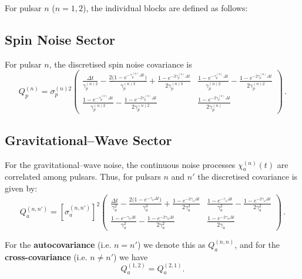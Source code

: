 \documentclass{tufte-handout} %
\begin{document}
	For pulsar \(n\) (\(n=1,2\)), the individual blocks are defined as follows:
	
	\subsection*{Spin Noise Sector}
	
	For pulsar \(n\), the discretised spin noise covariance is
	\begin{equation}
		Q_p^{(n)} = \sigma_p^{(n)2}
		\begin{pmatrix}
			\displaystyle \frac{\Delta t}{\gamma_p^{(n)2}} - \frac{2\bigl(1-e^{-\gamma_p^{(n)}\Delta t}\bigr)}{\gamma_p^{(n)3}} + \frac{1-e^{-2\gamma_p^{(n)}\Delta t}}{2\gamma_p^{(n)3}} 
			& \displaystyle \frac{1-e^{-\gamma_p^{(n)}\Delta t}}{\gamma_p^{(n)2}} - \frac{1-e^{-2\gamma_p^{(n)}\Delta t}}{2\gamma_p^{(n)2}} \\[2mm]
			\displaystyle \frac{1-e^{-\gamma_p^{(n)}\Delta t}}{\gamma_p^{(n)2}} - \frac{1-e^{-2\gamma_p^{(n)}\Delta t}}{2\gamma_p^{(n)2}} 
			& \displaystyle \frac{1-e^{-2\gamma_p^{(n)}\Delta t}}{2\gamma_p^{(n)}}
		\end{pmatrix}\,.
	\end{equation}
	
	\subsection*{Gravitational--Wave Sector}
	
	For the gravitational--wave noise, the continuous noise processes \(\chi_a^{(n)}(t)\) are correlated among pulsars. Thus, for pulsars \(n\) and \(n'\) the discretised covariance is given by:
	\begin{equation}
		Q_a^{(n,n')} = \left[\sigma_a^{(n,n')}\right]^2
		\begin{pmatrix}
			\displaystyle \frac{\Delta t}{\gamma_a^2} - \frac{2\bigl(1-e^{-\gamma_a\Delta t}\bigr)}{\gamma_a^3} + \frac{1-e^{-2\gamma_a\Delta t}}{2\gamma_a^3} 
			& \displaystyle \frac{1-e^{-\gamma_a\Delta t}}{\gamma_a^2} - \frac{1-e^{-2\gamma_a\Delta t}}{2\gamma_a^2} \\[2mm]
			\displaystyle \frac{1-e^{-\gamma_a\Delta t}}{\gamma_a^2} - \frac{1-e^{-2\gamma_a\Delta t}}{2\gamma_a^2} 
			& \displaystyle \frac{1-e^{-2\gamma_a\Delta t}}{2\gamma_a}
		\end{pmatrix}\,.
	\end{equation}
	
	For the \textbf{autocovariance} (i.e. \(n=n'\)) we denote this as \(Q_a^{(n,n)}\), and for the \textbf{cross-covariance} (i.e. \(n \neq n'\)) we have
	\[
	Q_a^{(1,2)} = Q_a^{(2,1)}.
	\]
	
\end{document}
